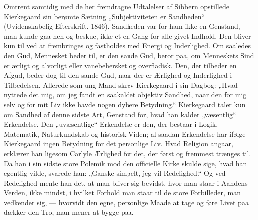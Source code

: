 \documentclass[12pt,a4paper,openany]{book}
\newcommand{\opage}[1]{\marginnote{\footnotesize\textit{[#1]}}}
\begin{document}
Omtrent samtidig med de her fremdragne Udtalelser af Sibbern
\opage{140}opstillede Kierkegaard sin berømte Sætning „Subjektiviteten er
Sandheden“ (Uvidenskabelig Efterskrift. 1846). Sandheden var for
ham ikke en Genstand, man kunde gaa hen og beskue, ikke et en
Gang for alle givet Indhold. Den bliver kun til ved at frembringes
og fastholdes med Energi og Inderlighed. Om saaledes den Gud,
Mennesket beder til, er den sande Gud, beror paa, om Menneskets
Sind er ærligt og alvorligt eller vanebehersket og overfladisk. Den,
der tilbeder en Afgud, beder dog til den sande Gud, naar der er Ærlighed
og Inderlighed i Tilbedelsen. Allerede som ung Mand skrev
Kierkegaard i sin Dagbog: „Hvad nyttede det mig, om jeg fandt en
saakaldet objektiv Sandhed, naar den for mig selv og for mit Liv
ikke havde nogen dybere Betydning.“ Kierkegaard taler kun om
Sandhed af denne sidste Art, Genstand for, hvad han kalder „væsentlig“
Erkendelse. Den „uvæsentlige“ Erkendelse er den, der bestaar i
Logik, Matematik, Naturkundskab og historisk Viden; al saadan
Erkendelse har ifølge Kierkegaard ingen Betydning for det personlige
Liv. Hvad Religion angaar, erklærer han ligesom Carlyle Ærlighed
for det, der først og fremmest trænges til. Da han i sin sidste
store Polemik mod den officielle Kirke skulde sige, hvad han egentlig
vilde, svarede han: „Ganske simpelt, jeg vil Redelighed.“ Og ved
Redelighed mente han det, at man bliver sig bevidst, hvor man staar
i Aandens Verden, ikke mindst, i hvilket Forhold man staar til de
store Forbilleder, man vedkender sig, --- hvorvidt den egne, personlige
Maade at tage og føre Livet paa dækker den Tro, man mener
at bygge paa.
\end{document}
